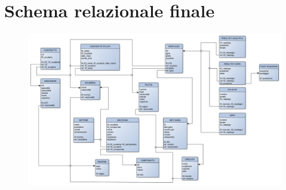 \documentclass[a4paper,12pt]{report}
\begin{document}
		\section{Schema relazionale finale}
			\begin{figure}[htbp]
				\centering
				\includegraphics[scale=0.8]{copies/schemaFinale.pdf}
			\end{figure}
\end{document}
